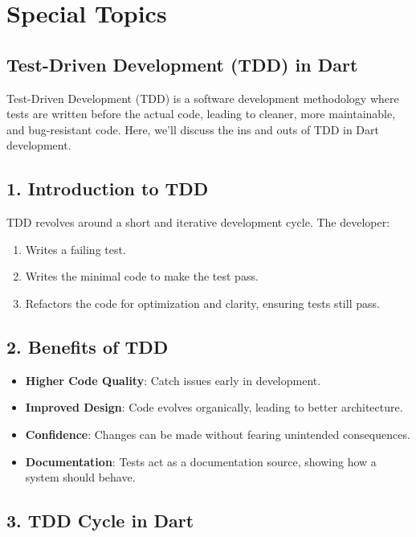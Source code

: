 \section{Special Topics}

\subsection{Test-Driven Development (TDD) in Dart}

Test-Driven Development (TDD) is a software development methodology where tests are written before the actual code, leading to cleaner, more maintainable, and bug-resistant code. Here, we'll discuss the ins and outs of TDD in Dart development.

\subsection*{1. Introduction to TDD}

TDD revolves around a short and iterative development cycle. The developer:

\begin{enumerate}
 \item Writes a failing test.
 \item Writes the minimal code to make the test pass.
 \item Refactors the code for optimization and clarity, ensuring tests still pass.
\end{enumerate}

\subsection*{2. Benefits of TDD}

\begin{itemize}
 \item \textbf{Higher Code Quality}: Catch issues early in development.
 \item \textbf{Improved Design}: Code evolves organically, leading to better architecture.
 \item \textbf{Confidence}: Changes can be made without fearing unintended consequences.
 \item \textbf{Documentation}: Tests act as a documentation source, showing how a system should behave.
\end{itemize}

\subsection*{3. TDD Cycle in Dart}

